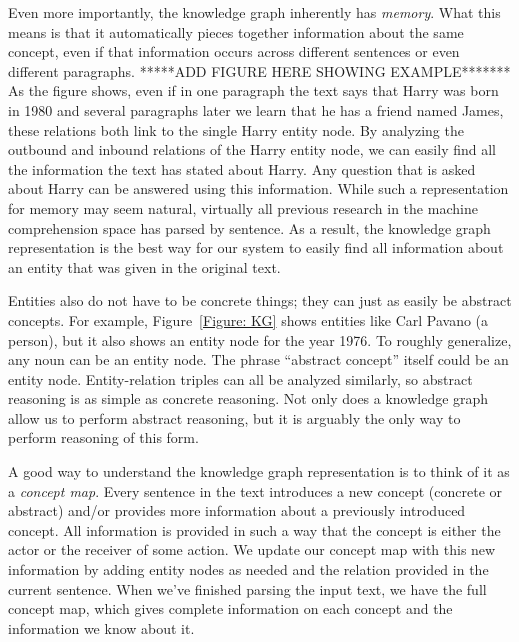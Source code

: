 \documentclass[pageno]{jpaper}
\begin{document}
Even more importantly, the knowledge graph inherently has \textit{memory}. What
this means is that it automatically pieces together information about the same
concept, even if that information occurs across different sentences or even
different paragraphs. *****ADD FIGURE HERE SHOWING EXAMPLE******* As the figure
shows, even if in one paragraph the text says that Harry was born in 1980 and
several paragraphs later we learn that he has a friend named James, these
relations both link to the single Harry entity node. By analyzing the outbound
and inbound relations of the Harry entity node, we can easily find all the
information the text has stated about Harry. Any question that is asked about
Harry can be answered using this information. While such a representation for
memory may seem natural, virtually all previous research in the machine
comprehension space has parsed by sentence. As a result, the knowledge graph
representation is the best way for our system to easily find all information
about an entity that was given in the original text.

Entities also do not have to be concrete things; they can just as easily be
abstract concepts. For example, Figure~\ref{Figure: KG} shows entities like Carl
Pavano (a person), but it also shows an entity node for the year 1976. To
roughly generalize, any noun can be an entity node. The phrase ``abstract
concept'' itself could be an entity node. Entity-relation triples can all be
analyzed similarly, so abstract reasoning is as simple as concrete reasoning.
Not only does a knowledge graph allow us to perform abstract reasoning, but it
is arguably the only way to perform reasoning of this form.

A good way to understand the knowledge graph representation is to think of it as
a \textit{concept map}. Every sentence in the text introduces a new concept
(concrete or abstract) and/or provides more information about a previously
introduced concept. All information is provided in such a way that the concept
is either the actor or the receiver of some action. We update our concept map
with this new information by adding entity nodes as needed and the relation
provided in the current sentence. When we've finished parsing the input text,
we have the full concept map, which gives complete information on each concept
and the information we know about it.
\end{document}
